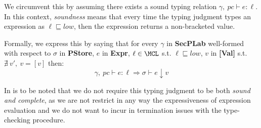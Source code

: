 We circumvent this by assuming there exists a sound typing relation $ \gamma,~pc \vdash e: \ell $.
In this context, \emph{soundness} means that every time the typing judgment types an expression as $\ell \sqsubseteq low$, then the expression returns a non-bracketed value.

Formally, we express this by saying that for every $\gamma$ in \textbf{SecPLab} well-formed with respect to $\sigma$ in \textbf{PStore}, $e$ in \textbf{Expr}, $\ell \in \MCL$ s.t. $\ell \sqsubseteq low$, $v$ in \textbf{[Val]} s.t. $\nexists~v',~v = [v]$ then:
$$
\gamma,~pc \vdash e: \ell \Rightarrow \sigma \vdash e \downarrow v
$$

In is to be noted that we do not require this typing judgment to be both \emph{sound and complete}, as we are not restrict in any way the expressiveness of expression evaluation and we do not want to incur in termination issues with the type-checking procedure.
